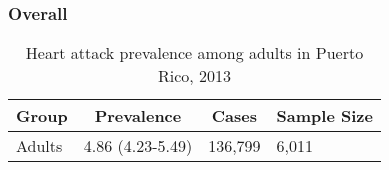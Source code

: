 

\subsubsection{Overall}




\begin{table}[H]
\caption{Heart attack prevalence among adults in Puerto Rico, 2013\label{tab:Overall.tabl.Heart_Attack.2013}} 
\begin{center}
\begin{tabular}{llll}
\hline\hline
\multicolumn{1}{l}{Group}&\multicolumn{1}{c}{Prevalence}&\multicolumn{1}{c}{Cases}&\multicolumn{1}{c}{Sample Size}\tabularnewline
\hline
Adults&4.86 (4.23-5.49)&136,799&6,011\tabularnewline
\hline
\end{tabular}\end{center}

\end{table}




